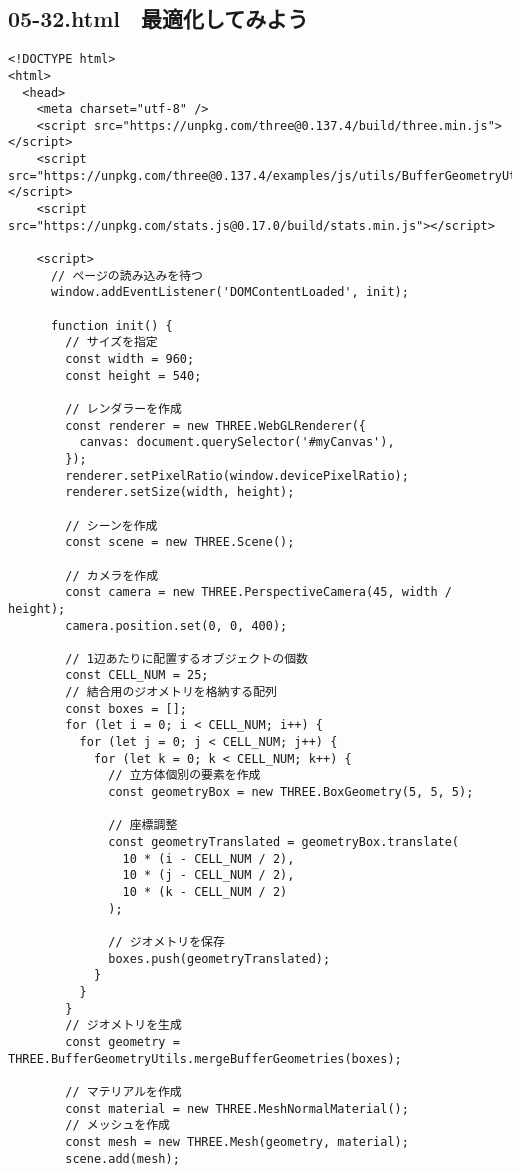 \documentclass[mingoth,11pt,a4j,uplatex]{jsarticle}
\begin{document}
\subsection{05-32.html　最適化してみよう}
\begin{lstlisting}[caption=05-32.html]
<!DOCTYPE html>
<html>
  <head>
    <meta charset="utf-8" />
    <script src="https://unpkg.com/three@0.137.4/build/three.min.js"></script>
    <script src="https://unpkg.com/three@0.137.4/examples/js/utils/BufferGeometryUtils.js"></script>
    <script src="https://unpkg.com/stats.js@0.17.0/build/stats.min.js"></script>

    <script>
      // ページの読み込みを待つ
      window.addEventListener('DOMContentLoaded', init);

      function init() {
        // サイズを指定
        const width = 960;
        const height = 540;

        // レンダラーを作成
        const renderer = new THREE.WebGLRenderer({
          canvas: document.querySelector('#myCanvas'),
        });
        renderer.setPixelRatio(window.devicePixelRatio);
        renderer.setSize(width, height);

        // シーンを作成
        const scene = new THREE.Scene();

        // カメラを作成
        const camera = new THREE.PerspectiveCamera(45, width / height);
        camera.position.set(0, 0, 400);

        // 1辺あたりに配置するオブジェクトの個数
        const CELL_NUM = 25;
        // 結合用のジオメトリを格納する配列
        const boxes = [];
        for (let i = 0; i < CELL_NUM; i++) {
          for (let j = 0; j < CELL_NUM; j++) {
            for (let k = 0; k < CELL_NUM; k++) {
              // 立方体個別の要素を作成
              const geometryBox = new THREE.BoxGeometry(5, 5, 5);

              // 座標調整
              const geometryTranslated = geometryBox.translate(
                10 * (i - CELL_NUM / 2),
                10 * (j - CELL_NUM / 2),
                10 * (k - CELL_NUM / 2)
              );

              // ジオメトリを保存
              boxes.push(geometryTranslated);
            }
          }
        }
        // ジオメトリを生成
        const geometry = THREE.BufferGeometryUtils.mergeBufferGeometries(boxes);

        // マテリアルを作成
        const material = new THREE.MeshNormalMaterial();
        // メッシュを作成
        const mesh = new THREE.Mesh(geometry, material);
        scene.add(mesh);


\end{lstlisting}
\end{document}
